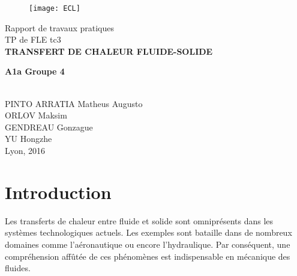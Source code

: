 \documentclass[14pt]{article}
\begin{document}
\begin{titlepage}

 \renewcommand{\labelitemi}{$\bullet$}	

\begin{figure}[htbp]
 \begin{flushleft} 
\texttt{[image: ECL]}
\end{flushleft}
\end{figure}

\begin{center}
    \begin{LARGE}
    Rapport de travaux pratiques\\ TP de FLE tc3\\
    \vspace{3cm}
    \textbf{TRANSFERT DE CHALEUR FLUIDE-SOLIDE}
   

        \vspace{3cm}
    
    \textbf{A1a Groupe 4}
    \vspace{0.5cm}
    \end{LARGE}
    \begin{large}
    \\
    PINTO ARRATIA Matheus Augusto\\
    ORLOV Maksim\\
    GENDREAU Gonzague\\
    YU Hongzhe\\
    \vspace{4cm}
    Lyon, 2016
    \end{large}
    \end{center}
\end{titlepage}

\tableofcontents
\newpage
\large

\section{Introduction}
Les transferts de chaleur entre fluide et solide sont omniprésents dans les systèmes technologiques actuels. Les exemples sont bataille dans de nombreux domaines comme l'aéronautique ou encore l'hydraulique. Par conséquent, une compréhension affûtée de ces phénomènes est indispensable en mécanique des fluides. 
\end{document}
